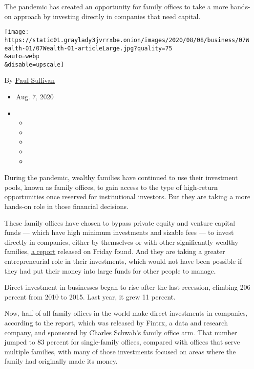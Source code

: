 The pandemic has created an opportunity for family offices to take a
more hands-on approach by investing directly in companies that need
capital.

\texttt{[image: https://static01.graylady3jvrrxbe.onion/images/2020/08/08/business/07Wealth-01/07Wealth-01-articleLarge.jpg?quality=75\\\&auto=webp\\\&disable=upscale]}

By \href{https://www.nytimes3xbfgragh.onion/by/paul-sullivan}{Paul
Sullivan}

\begin{itemize}
\item
  Aug. 7, 2020
\item
  \begin{itemize}
  \item
  \item
  \item
  \item
  \item
  \end{itemize}
\end{itemize}

During the pandemic, wealthy families have continued to use their
investment pools, known as family offices, to gain access to the type of
high-return opportunities once reserved for institutional investors. But
they are taking a more hands-on role in those financial decisions.

These family offices have chosen to bypass private equity and venture
capital funds --- which have high minimum investments and sizable fees
--- to invest directly in companies, either by themselves or with other
significantly wealthy families,
\href{https://www.fintrx.com/fintrx-charles-schwab-2020-family-office-report}{a
report} released on Friday found. And they are taking a greater
entrepreneurial role in their investments, which would not have been
possible if they had put their money into large funds for other people
to manage.

Direct investment in businesses began to rise after the last recession,
climbing 206 percent from 2010 to 2015. Last year, it grew 11 percent.

Now, half of all family offices in the world make direct investments in
companies, according to the report, which was released by Fintrx, a data
and research company, and sponsored by Charles Schwab's family office
arm. That number jumped to 83 percent for single-family offices,
compared with offices that serve multiple families, with many of those
investments focused on areas where the family had originally made its
money.


